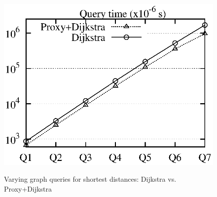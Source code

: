 {\begin{figure}[t!]
\begin{center}
{\includegraphics[scale=0.45]{./exp/query_eus_dist_dj.eps}}
\hspace{-4ex}\vspace{-1.5ex}
\end{center}
\vspace{1ex}
\caption{Varying graph queries  for shortest distances: Dijkstra vs. Proxy+Dijkstra}
\label{fig:performance_dist_queries_dj}
\vspace{-1ex}
\end{figure}
}


